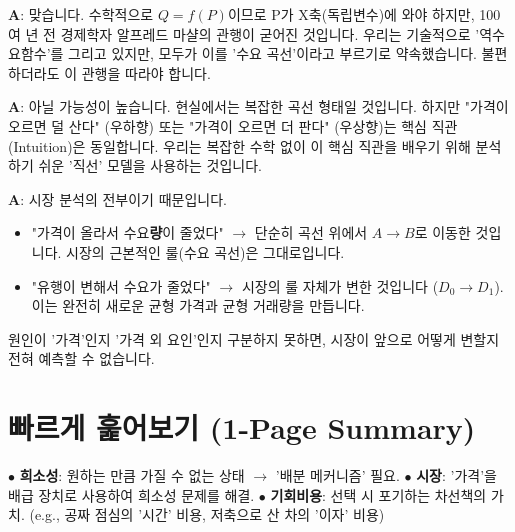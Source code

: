 \documentclass[11pt,a4paper]{book}
\theoremstyle{definition}
\begin{document}
\begin{keypointbox}[title={Q: 왜 수요 곡선을 그릴 때 가격(P)을 Y축에 두나요? 수학적으로 틀린 것 아닌가요?}]
    \textbf{A}: 맞습니다. 수학적으로 $Q=f(P)$이므로 P가 X축(독립변수)에 와야 하지만, 100여 년 전 경제학자 알프레드 마샬의 관행이 굳어진 것입니다. 우리는 기술적으로 '역수요함수'를 그리고 있지만, 모두가 이를 '수요 곡선'이라고 부르기로 약속했습니다. 불편하더라도 이 관행을 따라야 합니다.
\end{keypointbox}

\begin{keypointbox}[title={Q: 수요/공급 곡선은 현실에서 정말 직선(Linear)인가요?}]
    \textbf{A}: 아닐 가능성이 높습니다. 현실에서는 복잡한 곡선 형태일 것입니다. 하지만 "가격이 오르면 덜 산다" (우하향) 또는 "가격이 오르면 더 판다" (우상향)는 핵심 직관(Intuition)은 동일합니다. 우리는 복잡한 수학 없이 이 핵심 직관을 배우기 위해 분석하기 쉬운 '직선' 모델을 사용하는 것입니다.
\end{keypointbox}

\begin{keypointbox}[title={Q: '수요의 변화'와 '수요량의 변화'를 구분하는 것이 왜 그렇게 중요한가요?}]
    \textbf{A}: 시장 분석의 전부이기 때문입니다.
    \begin{itemize}
        \item "가격이 올라서 수요\textbf{량}이 줄었다" $\rightarrow$ 단순히 곡선 위에서 $A \rightarrow B$로 이동한 것입니다. 시장의 근본적인 룰(수요 곡선)은 그대로입니다.
        \item "유행이 변해서 수요가 줄었다" $\rightarrow$ 시장의 룰 자체가 변한 것입니다 ($D_0 \rightarrow D_1$). 이는 완전히 새로운 균형 가격과 균형 거래량을 만듭니다.
    \end{itemize}
    원인이 '가격'인지 '가격 외 요인'인지 구분하지 못하면, 시장이 앞으로 어떻게 변할지 전혀 예측할 수 없습니다.
\end{keypointbox}


\section{빠르게 훑어보기 (1-Page Summary)}

\begin{tcolorbox}[title=\textbf{1. 희소성 (Scarcity) \& 기회비용 (Opportunity Cost)}]
    $\bullet$ \textbf{희소성}: 원하는 만큼 가질 수 없는 상태 $\rightarrow$ '배분 메커니즘' 필요.
    \newline
    $\bullet$ \textbf{시장}: '가격'을 배급 장치로 사용하여 희소성 문제를 해결.
    \newline
    $\bullet$ \textbf{기회비용}: 선택 시 포기하는 차선책의 가치. (e.g., 공짜 점심의 '시간' 비용, 저축으로 산 차의 '이자' 비용)
\end{tcolorbox}
\end{document}
